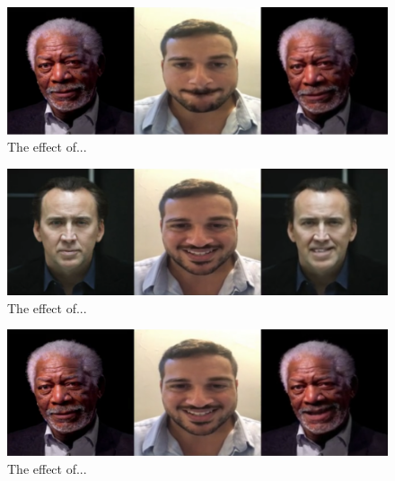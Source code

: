\documentclass[english,12pt]{article}
\begin{document}
\begin{figure}[htb]
  \begin{centering}
      \includegraphics[scale=0.29]{images/‏‏Amit_lips_freeman.PNG}
  \par\end{centering}
  \caption{\label{fig:Amit_lips_freeman}The effect of...}
\end{figure}

\begin{figure}[htb]
  \begin{centering}
      \includegraphics[scale=0.29]{images/‏‏Amit_smile_cage.PNG}
  \par\end{centering}
  \caption{\label{fig:Amit_smile_cage}The effect of...}
\end{figure}

\begin{figure}[htb]
  \begin{centering}
      \includegraphics[scale=0.29]{images/‏‏Amit_smile_freeman.PNG}
  \par\end{centering}
  \caption{\label{fig:Amit_smile_freeman}The effect of...}
\end{figure}
\end{document}
